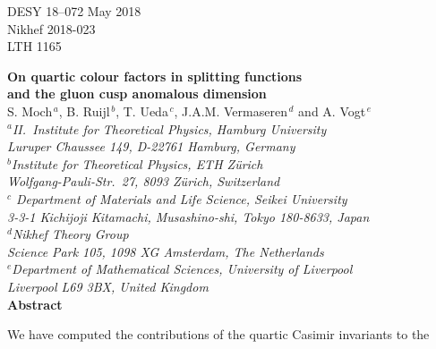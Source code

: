 \documentclass[12pt]{article}
\begin{document}
\setlength{\parskip}{0.2cm}
\setlength{\baselineskip}{0.55cm}

\begin{titlepage}
\noindent
DESY 18--072 \hfill May 2018\\
Nikhef 2018-023 \\
LTH 1165 \\
\vspace{0.6cm}
%
\begin{center}
{\LARGE \bf On quartic colour factors in splitting functions\\[1ex]
 and the gluon cusp anomalous dimension}\\ 
\vspace{1.4cm}
%
\large
%
S. Moch$^{\, a}$, B. Ruijl$^{\, b}$, T. Ueda$^{\, c}$, 
J.A.M. Vermaseren$^{\, d}$ and A. Vogt$^{\, e}$\\
\vspace{1.2cm}
%
\normalsize
{\it $^a$II.~Institute for Theoretical Physics, Hamburg University\\
\vspace{0.5mm}
Luruper Chaussee 149, D-22761 Hamburg, Germany}\\
\vspace{4mm}
{\it $^b$Institute for Theoretical Physics, ETH Z\"urich\\
\vspace{0.5mm}
Wolfgang-Pauli-Str.~27, 8093 Z\"urich, Switzerland}\\
\vspace{4mm}
{\it $^c$ Department of Materials and Life Science, Seikei University\\
\vspace{0.5mm}
3-3-1 Kichijoji Kitamachi, Musashino-shi, Tokyo 180-8633, Japan}\\
\vspace{4mm}
{\it $^d$Nikhef Theory Group \\
\vspace{0.5mm}
Science Park 105, 1098 XG Amsterdam, The Netherlands} \\
\vspace{4mm}
{\it $^e$Department of Mathematical Sciences, University of Liverpool\\
\vspace{0.5mm}
Liverpool L69 3BX, United Kingdom}\\
\vspace{1.4cm}
%
{\large \bf Abstract}
\vspace{-0.2cm}
\end{center}
%
We have computed the contributions of the quartic Casimir invariants to the

\end{titlepage}
\end{document}
